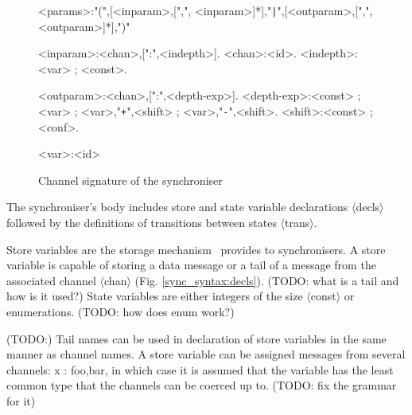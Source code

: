 \begin{figure}[h!]
\small
\begin{grammar}
<params>:"(",[<inparam>,[",", <inparam>]*],"{\tt |}",[<outparam>,[",", <outparam>]*],")"
\end{grammar}
\end{figure}

\begin{figure}[h!]
\small
\begin{grammar}
<inparam>:<chan>,[":",<indepth>].
<chan>:<id>.
<indepth>:<var> ; <const>.

<outparam>:<chan>,[":",<depth-exp>].
<depth-exp>:<const> ; <var> ; <var>,"{\tt+}",<shift> ; <var>,"{\tt -}",<shift>.
<shift>:<const> ; <conf>.

<var>:<id>
\end{grammar}
\caption{Channel signature of the synchroniser}
\label{sync_syntax:params}
\end{figure}

The synchroniser's body includes store and state variable declarations $\langle$decls$\rangle$ followed by the definitions of transitions between states $\langle$trans$\rangle$.

Store variables are the storage mechanism \ak\ provides to synchronisers. A store variable is capable of storing a data message or a tail of a message from the associated channel $\langle$chan$\rangle$ (Fig. \ref{sync_syntax:decls}). (TODO: what is a tail and how is it used?) State variables are either integers of the size $\langle$const$\rangle$ or enumerations. (TODO: how does enum work?)

(TODO:) Tail names can be used in declaration of store variables in the same manner as channel names. A store variable can be assigned messages from several channels: x : foo,bar, in which case it is assumed that the variable has the least common type that the channels can be coerced up to. (TODO: fix the grammar for it)

